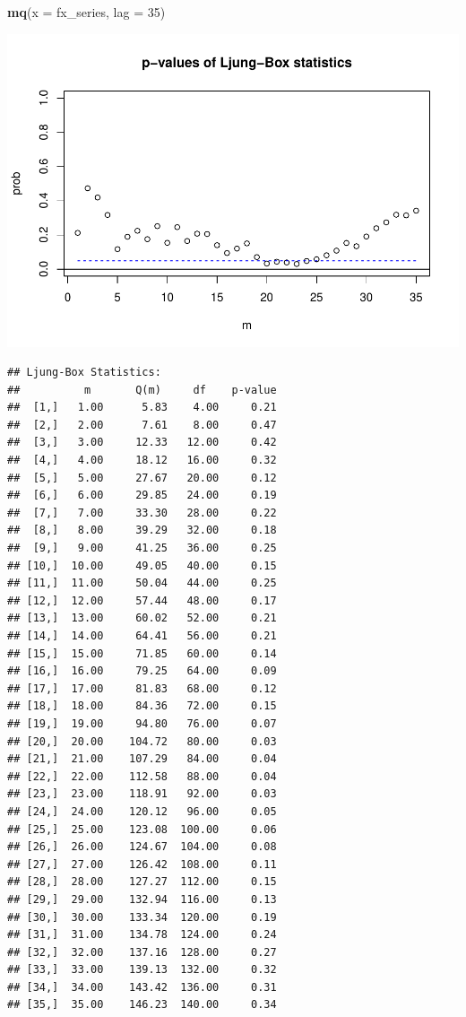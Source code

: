 \documentclass[12pt,a4paper]{article}
\newenvironment{Shaded}{\begin{snugshade}}{\end{snugshade}}
\newcommand{\DataTypeTok}[1]{\textcolor[rgb]{0.13,0.29,0.53}{#1}}
\newcommand{\DecValTok}[1]{\textcolor[rgb]{0.00,0.00,0.81}{#1}}
\newcommand{\KeywordTok}[1]{\textcolor[rgb]{0.13,0.29,0.53}{\textbf{#1}}}
\newcommand{\NormalTok}[1]{#1}
\begin{document}
\begin{Shaded}
\begin{Highlighting}[]
\KeywordTok{mq}\NormalTok{(}\DataTypeTok{x =}\NormalTok{ fx_series, }\DataTypeTok{lag =} \DecValTok{35}\NormalTok{)}
\end{Highlighting}
\end{Shaded}

\includegraphics{solution_exercise_5_files/figure-latex/unnamed-chunk-19-1.pdf}

\begin{verbatim}
## Ljung-Box Statistics:  
##          m       Q(m)     df    p-value
##  [1,]   1.00      5.83    4.00     0.21
##  [2,]   2.00      7.61    8.00     0.47
##  [3,]   3.00     12.33   12.00     0.42
##  [4,]   4.00     18.12   16.00     0.32
##  [5,]   5.00     27.67   20.00     0.12
##  [6,]   6.00     29.85   24.00     0.19
##  [7,]   7.00     33.30   28.00     0.22
##  [8,]   8.00     39.29   32.00     0.18
##  [9,]   9.00     41.25   36.00     0.25
## [10,]  10.00     49.05   40.00     0.15
## [11,]  11.00     50.04   44.00     0.25
## [12,]  12.00     57.44   48.00     0.17
## [13,]  13.00     60.02   52.00     0.21
## [14,]  14.00     64.41   56.00     0.21
## [15,]  15.00     71.85   60.00     0.14
## [16,]  16.00     79.25   64.00     0.09
## [17,]  17.00     81.83   68.00     0.12
## [18,]  18.00     84.36   72.00     0.15
## [19,]  19.00     94.80   76.00     0.07
## [20,]  20.00    104.72   80.00     0.03
## [21,]  21.00    107.29   84.00     0.04
## [22,]  22.00    112.58   88.00     0.04
## [23,]  23.00    118.91   92.00     0.03
## [24,]  24.00    120.12   96.00     0.05
## [25,]  25.00    123.08  100.00     0.06
## [26,]  26.00    124.67  104.00     0.08
## [27,]  27.00    126.42  108.00     0.11
## [28,]  28.00    127.27  112.00     0.15
## [29,]  29.00    132.94  116.00     0.13
## [30,]  30.00    133.34  120.00     0.19
## [31,]  31.00    134.78  124.00     0.24
## [32,]  32.00    137.16  128.00     0.27
## [33,]  33.00    139.13  132.00     0.32
## [34,]  34.00    143.42  136.00     0.31
## [35,]  35.00    146.23  140.00     0.34
\end{verbatim}
\end{document}
